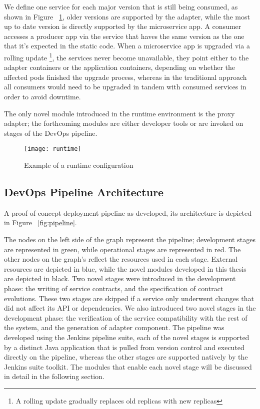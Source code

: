 We define one service for each major version that is still being consumed, as shown in Figure ~\ref{fig:runtime},
older versions are supported by the adapter, while the most up to date version is directly supported by the microservice app.
A consumer accesses a producer app via the service that haves the same version as the one that it's expected in the static code.
When a microservice app is upgraded via a rolling update \footnote{A rolling update gradually replaces old replicas with new replicas},
the services never become unavailable, they point either to the adapter containers or the application containers, depending on whether the affected pods finished the upgrade process,
whereas in the traditional approach all consumers would need to be upgraded in tandem with consumed services in order to avoid downtime.

The only novel module introduced in the runtime environment is the proxy adapter;
the forthcoming modules are either developer tools or are invoked on stages of the DevOps pipeline.

\begin{figure}[htbp]
    \centering
    \texttt{[image: runtime]}
    \caption{Example of a runtime configuration}
    \label{fig:runtime}
\end{figure}

\subsection{DevOps Pipeline Architecture} %
\label{sec:devops_pipeline_architecture}

A proof-of-concept deployment pipeline as developed, its architecture is depicted in Figure ~\ref{fig:pipeline}.

The nodes on the left side of the graph represent the pipeline;
development stages are represented in green, while operational stages are represented in red.
The other nodes on the graph's reflect the resources used in each stage.
External resources are depicted in blue, while the novel modules developed in this thesis are depicted in black.
Two novel stages were introduced in the development phase: the writing of service contracts, and the specification of contract evolutions.
These two stages are skipped if a service only underwent changes that did not affect its API or dependencies.
We also introduced two novel stages in the development phase:
the verification of the service compatibility with the rest of the system, and the generation of adapter component.
The pipeline was developed using the Jenkins pipeline suite, each of the novel stages is supported by a distinct Java application that is pulled from version control
and executed directly on the pipeline, whereas the other stages are supported natively by the Jenkins suite toolkit.
The modules that enable each novel stage will be discussed in detail in the following section.

